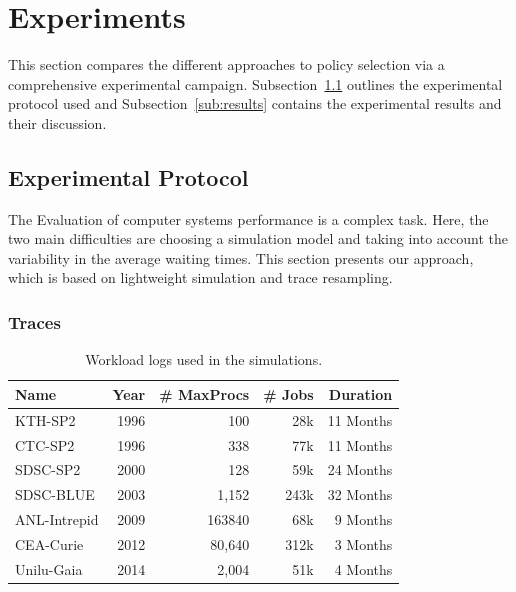 \documentclass[sigconf,anonymous]{acmart}
\newcommand{\ra}[1]{\renewcommand{\arraystretch}{#1}}
\begin{document}
\section{Experiments}
\label{sec:experiments}

This section compares the different approaches to policy selection via a
comprehensive experimental campaign.  Subsection~\ref{sub:protocol} outlines
the experimental protocol used and Subsection~\ref{sub:results} contains the
experimental results and their discussion.

\subsection{Experimental Protocol}
\label{sub:protocol}

The Evaluation of computer systems performance is a complex
task. Here, the two main difficulties are choosing a simulation
model and taking into account the variability in the average waiting times.
This section presents our approach, which is based on lightweight simulation
and trace resampling.

\subsubsection{Traces}
\label{sub:traces}

\begin{table}[]
  \centering
  \ra{1.3}
  \caption{Workload logs used in the simulations.}
  \label{tab:logs}
  \begin{tabular}{@{}lrrrr@{}}
    \hline
    Name          & Year & \# MaxProcs & \# Jobs & Duration\\
    \hline
    KTH-SP2       & 1996 & 100         & 28k     & 11 Months\\
    CTC-SP2       & 1996 & 338         & 77k     & 11 Months\\
    SDSC-SP2      & 2000 & 128         & 59k     & 24 Months\\
    SDSC-BLUE     & 2003 & 1,152       & 243k    & 32 Months\\
    ANL-Intrepid  & 2009 & 163840      & 68k     & 9  Months\\
    CEA-Curie     & 2012 & 80,640      & 312k    & 3  Months\\
    Unilu-Gaia    & 2014 & 2,004       & 51k     & 4  Months\\
    \hline
  \end{tabular}
\end{table}
\end{document}
